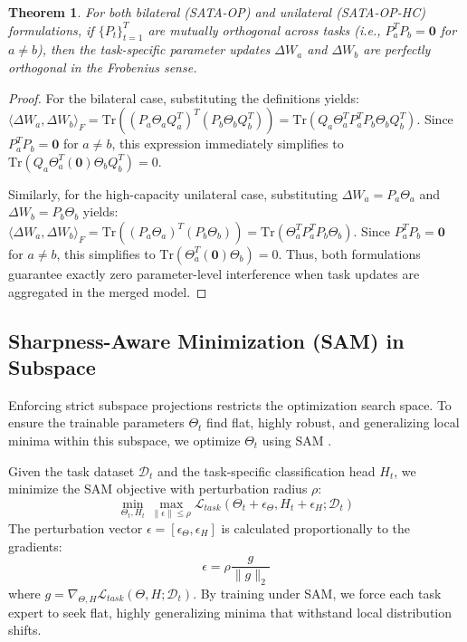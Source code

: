 \documentclass{article}
\theoremstyle{plain}
\newtheorem{theorem}{Theorem}[section]
\theoremstyle{definition}
\theoremstyle{remark}
\begin{document}
\begin{theorem}
For both bilateral (SATA-OP) and unilateral (SATA-OP-HC) formulations, if $\{P_t\}_{t=1}^T$ are mutually orthogonal across tasks (i.e., $P_a^T P_b = \mathbf{0}$ for $a \neq b$), then the task-specific parameter updates $\Delta W_a$ and $\Delta W_b$ are perfectly orthogonal in the Frobenius sense.
\end{theorem}

\begin{proof}
For the bilateral case, substituting the definitions yields: $\langle \Delta W_a, \Delta W_b \rangle_F = \text{Tr}\left( (P_a \Theta_a Q_a^T)^T (P_b \Theta_b Q_b^T) \right) = \text{Tr}\left( Q_a \Theta_a^T P_a^T P_b \Theta_b Q_b^T \right)$. Since $P_a^T P_b = \mathbf{0}$ for $a \neq b$, this expression immediately simplifies to $\text{Tr}\left( Q_a \Theta_a^T (\mathbf{0}) \Theta_b Q_b^T \right) = 0$.

Similarly, for the high-capacity unilateral case, substituting $\Delta W_a = P_a \Theta_a$ and $\Delta W_b = P_b \Theta_b$ yields: $\langle \Delta W_a, \Delta W_b \rangle_F = \text{Tr}\left( (P_a \Theta_a)^T (P_b \Theta_b) \right) = \text{Tr}\left( \Theta_a^T P_a^T P_b \Theta_b \right)$. Since $P_a^T P_b = \mathbf{0}$ for $a \neq b$, this simplifies to $\text{Tr}\left( \Theta_a^T (\mathbf{0}) \Theta_b \right) = 0$. Thus, both formulations guarantee exactly zero parameter-level interference when task updates are aggregated in the merged model.
\end{proof}

\subsection{Sharpness-Aware Minimization (SAM) in Subspace}
Enforcing strict subspace projections restricts the optimization search space. To ensure the trainable parameters $\Theta_t$ find flat, highly robust, and generalizing local minima within this subspace, we optimize $\Theta_t$ using SAM \cite{sam}.

Given the task dataset $\mathcal{D}_t$ and the task-specific classification head $H_t$, we minimize the SAM objective with perturbation radius $\rho$:
\begin{equation}
    \min_{\Theta_t, H_t} \max_{\|\epsilon\| \le \rho} \mathcal{L}_{task}\left(\Theta_t + \epsilon_\Theta, H_t + \epsilon_H; \mathcal{D}_t\right)
\end{equation}
The perturbation vector $\epsilon = [\epsilon_\Theta, \epsilon_H]$ is calculated proportionally to the gradients:
\begin{equation}
    \epsilon = \rho \frac{g}{\|g\|_2}
\end{equation}
where $g = \nabla_{\Theta, H} \mathcal{L}_{task}(\Theta, H; \mathcal{D}_t)$. By training under SAM, we force each task expert to seek flat, highly generalizing minima that withstand local distribution shifts.
\end{document}
